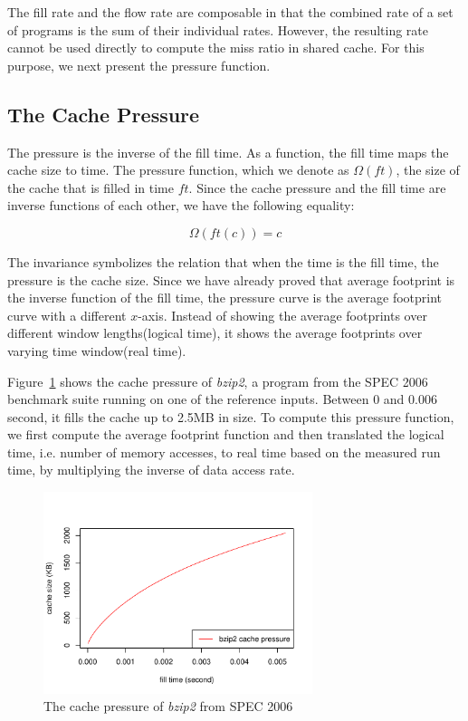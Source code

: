 The fill rate and the flow rate are composable in that the combined
rate of a set of programs is the sum of their individual rates.
However, the resulting rate cannot be used directly to compute the
miss ratio in shared cache.  For this purpose, we next present the
pressure function.


\subsection{The Cache Pressure}

The pressure is the inverse of the fill time.  As a function, the fill
time maps the cache size to time.  The pressure function, which we
denote as $\Omega( ft )$, the size of the cache that is filled in time
$ft$.  Since the cache pressure and the fill time are inverse
functions of each other, we have the following equality:

$$\Omega( ft( c ) ) = c$$

\noindent The invariance symbolizes the relation that when the time is
the fill time, the pressure is the cache size. Since we have already
proved that average footprint is the inverse function of the fill
time, the pressure curve is the average footprint curve with a different
$x$-axis.  Instead of showing the average footprints over different
window lengths(logical time), it shows the average footprints over
varying time window(real time). 

Figure~\ref{fig:bzip2_pressure} shows the cache pressure of
\emph{bzip2}, a program from the SPEC 2006 benchmark suite running on
one of the reference inputs.  Between 0 and 0.006 second, it fills the
cache up to 2.5MB in size.  To compute this pressure function, we first
compute the average footprint function and then translated the logical
time, i.e. number of memory accesses, to real time based on the
measured run time, by multiplying the inverse of data access rate.

\begin{figure}[h!]
\centering
\includegraphics[width=0.7\textwidth,type=pdf,ext=.pdf,read=.pdf]{figures/corun/bzip2_pres} 
\caption{The cache pressure of \emph{bzip2} from SPEC 2006}
\label{fig:bzip2_pressure}
\end{figure}

